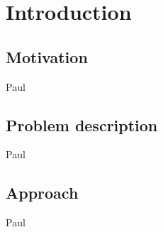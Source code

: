 \chapter{Introduction}


\section{Motivation}
Paul

\section{Problem description}
Paul

\section{Approach}
Paul
